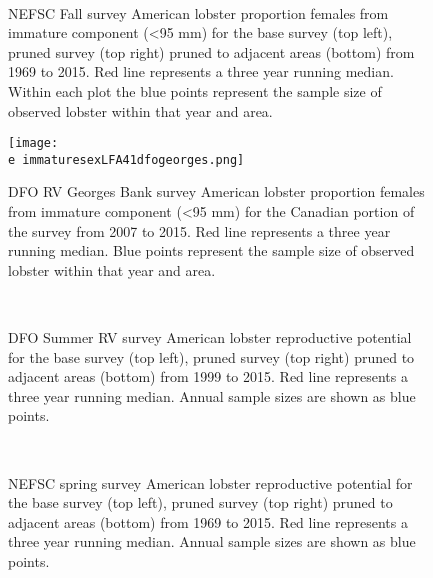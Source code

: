 \documentclass[11pt]{article}
\newcommand{\D}{.}
\newcommand{\e}{/backup/bio_data/bio.lobster/figures/} %
\begin{document}
\begin{figure}
\centering
{}
\\
\caption{NEFSC Fall survey American lobster proportion females from immature component (\textless 95 mm) for the base survey (top left), pruned survey (top right) pruned to adjacent areas (bottom) from 1969 to 2015. Red line represents a three year running median. Within each plot the blue points represent the sample size of observed lobster within that year and area. }
\end{figure}
\clearpage


\begin{figure}

    \texttt{[image: \\e immaturesexLFA41dfogeorges.png]}
    \caption{DFO RV Georges Bank survey American lobster proportion females from immature component (\textless 95 mm) for the Canadian portion of the survey from 2007 to 2015. Red line represents a three year running median. Blue points represent the sample size of observed lobster within that year and area.}

\end{figure}


\begin{figure}
\centering
{}
\\
\caption{DFO Summer RV survey American lobster reproductive potential for the base survey (top left), pruned survey (top right) pruned to adjacent areas (bottom) from 1999 to 2015. Red line represents a three year running median. Annual sample sizes are shown as blue points. }
\end{figure}
\clearpage


\begin{figure}
\centering
{}
\\
\caption{NEFSC spring survey American lobster reproductive potential for the base survey (top left), pruned survey (top right) pruned to adjacent areas (bottom) from 1969 to 2015. Red line represents a three year running median. Annual sample sizes are shown as blue points. }
\end{figure}
\clearpage
\end{document}
